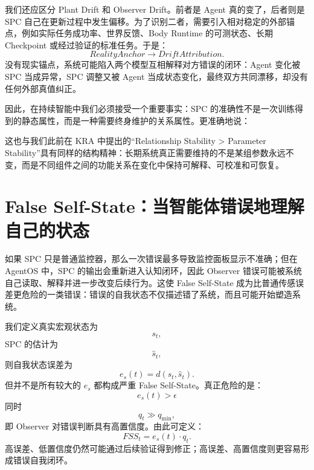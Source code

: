 我们还应区分 Plant Drift 和 Observer Drift。前者是 Agent 真的变了，后者则是 SPC 自己在更新过程中发生偏移。为了识别二者，需要引入相对稳定的外部锚点，例如实际任务成功率、世界反馈、Body Runtime 的可测状态、长期 Checkpoint 或经过验证的标准任务。于是：
\begin{equation}
RealityAnchor
\rightarrow
DriftAttribution.
\end{equation}
没有现实锚点，系统可能陷入两个模型互相解释对方错误的闭环：Agent 变化被 SPC 当成异常，SPC 调整又被 Agent 当成状态变化，最终双方共同漂移，却没有任何外部真值纠正。

因此，在持续智能中我们必须接受一个重要事实：SPC 的准确性不是一次训练得到的静态属性，而是一种需要终身维护的关系属性。更准确地说：
\begin{statementbox}
\centering
{}
\end{statementbox}
这也与我们此前在 KRA 中提出的“Relationship Stability > Parameter Stability”具有同样的结构精神：长期系统真正需要维持的不是某组参数永远不变，而是不同组件之间的功能关系在变化中保持可解释、可校准和可恢复。

\section{False Self-State：当智能体错误地理解自己的状态}
\label{sec:spc-false-self-state}

如果 SPC 只是普通监控器，那么一次错误最多导致监控面板显示不准确；但在 AgentOS 中，SPC 的输出会重新进入认知闭环，因此 Observer 错误可能被系统自己读取、解释并进一步改变后续行为。这使 False Self-State 成为比普通传感误差更危险的一类错误：错误的自我状态不仅描述错了系统，而且可能开始塑造系统。

我们定义真实宏观状态为
\begin{equation}
s_t,
\end{equation}
SPC 的估计为
\begin{equation}
\hat s_t,
\end{equation}
则自我状态误差为
\begin{equation}
e_s(t)
=
d(s_t,\hat s_t).
\end{equation}
但并不是所有较大的 $e_s$ 都构成严重 False Self-State。真正危险的是：
\begin{equation}
e_s(t)>\epsilon
\end{equation}
同时
\begin{equation}
q_t\gg q_{\min},
\end{equation}
即 Observer 对错误判断具有高置信度。由此可定义：
\begin{equation}
FSS_t
=
e_s(t)\cdot q_t.
\end{equation}
高误差、低置信度仍然可能通过后续验证得到修正；高误差、高置信度则更容易形成错误自我闭环。

